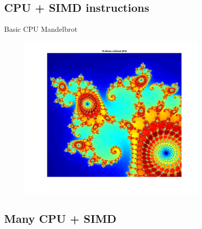 \documentclass[pdflatex,colorlinks,landscape]{beamer}
\begin{document}
\subsection{CPU + SIMD instructions}

\begin{frame}[allowframebreaks]{Basic CPU Mandelbrot}
  \begin{figure}[H]
    \includegraphics[width=0.8\textwidth]{BasicMandelbrot.png}
  \end{figure}
  \begin{tiny}
    
  \end{tiny}
\end{frame}

\subsection{Many CPU + SIMD }
\end{document}
